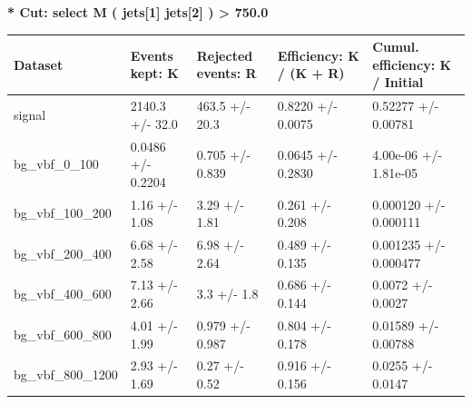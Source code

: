\documentclass[a4paper, 10pt]{article}
\begin{document}
\textbf{* Cut: select M ( jets[1] jets[2] ) > 750.0}\\
   \begin{table}[H]
  \begin{center}
    \begin{tabular}{|m{20.0mm}|m{27.0mm}|m{27.0mm}|m{33.0mm}|m{32.0mm}|}
      \hline
      {\cellcolor{yellow}         Dataset}& {\cellcolor{yellow}         Events kept:
          K}& {\cellcolor{yellow}         Rejected events:
          R}& {\cellcolor{yellow}         Efficiency:
          K /\- (K + R)}& {\cellcolor{yellow}         Cumul. efficiency:
          K /\- Initial}\\
      \hline
      {\cellcolor{white}         signal}& {\cellcolor{white}         2140.3 +/\-- 32.0}& {\cellcolor{white}         463.5 +/\-- 20.3}& {\cellcolor{white}         0.8220 +/\-- 0.0075}& {\cellcolor{white}         0.52277 +/\-- 0.00781}\\
      \hline
      {\cellcolor{white}         bg\_vbf\_0\_100}& {\cellcolor{white}         0.0486 +/\-- 0.2204}& {\cellcolor{white}         0.705 +/\-- 0.839}& {\cellcolor{white}         0.0645 +/\-- 0.2830}& {\cellcolor{white}         4.00e-06 +/\-- 1.81e-05}\\
      \hline
      {\cellcolor{white}         bg\_vbf\_100\_200}& {\cellcolor{white}         1.16 +/\-- 1.08}& {\cellcolor{white}         3.29 +/\-- 1.81}& {\cellcolor{white}         0.261 +/\-- 0.208}& {\cellcolor{white}         0.000120 +/\-- 0.000111}\\
      \hline
      {\cellcolor{white}         bg\_vbf\_200\_400}& {\cellcolor{white}         6.68 +/\-- 2.58}& {\cellcolor{white}         6.98 +/\-- 2.64}& {\cellcolor{white}         0.489 +/\-- 0.135}& {\cellcolor{white}         0.001235 +/\-- 0.000477}\\
      \hline
      {\cellcolor{white}         bg\_vbf\_400\_600}& {\cellcolor{white}         7.13 +/\-- 2.66}& {\cellcolor{white}         3.3 +/\-- 1.8}& {\cellcolor{white}         0.686 +/\-- 0.144}& {\cellcolor{white}         0.0072 +/\-- 0.0027}\\
      \hline
      {\cellcolor{white}         bg\_vbf\_600\_800}& {\cellcolor{white}         4.01 +/\-- 1.99}& {\cellcolor{white}         0.979 +/\-- 0.987}& {\cellcolor{white}         0.804 +/\-- 0.178}& {\cellcolor{white}         0.01589 +/\-- 0.00788}\\
      \hline
      {\cellcolor{white}         bg\_vbf\_800\_1200}& {\cellcolor{white}         2.93 +/\-- 1.69}& {\cellcolor{white}         0.27 +/\-- 0.52}& {\cellcolor{white}         0.916 +/\-- 0.156}& {\cellcolor{white}         0.0255 +/\-- 0.0147}\\

\end{tabular}
\end{center}
\end{table}
\end{document}
